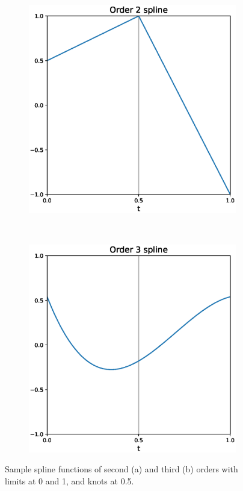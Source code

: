 \documentclass[energies,article,submit,pdftex,moreauthors]{Definitions/mdpi}
\begin{document}
\begin{figure}[b!]
    \centering
    \begin{subfigure}[b]{0.45\textwidth}
        \centering
        \includegraphics[width=\linewidth]{images/spline_order2}
        \caption{}
    \end{subfigure}%
    ~ 
    \begin{subfigure}[b]{0.45\textwidth}
        \centering
        \includegraphics[width=\linewidth]{images/spline_order3}
        \caption{}
    \end{subfigure}
    \caption{Sample spline functions of second (a) and third (b) orders with limits at 0 and 1, and knots at 0.5.}
\end{figure}
\unskip
\vspace{5mm}
\end{document}
